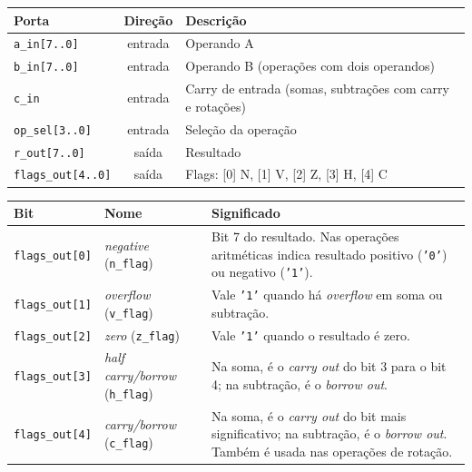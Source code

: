 \begin{quadro}[htb]
  \caption{Portas da ALU.}
  \label{quad:portas}
  \centering
  \begin{tabular}{lcl}
    \hline
    Porta & Direção & Descrição \\ \hline
    \texttt{a\_in[7..0]} & entrada & Operando A \\
    \texttt{b\_in[7..0]} & entrada & Operando B (operações com dois operandos) \\
    \texttt{c\_in} & entrada & Carry de entrada (somas, subtrações com carry e rotações) \\
    \texttt{op\_sel[3..0]} & entrada & Seleção da operação \\
    \texttt{r\_out[7..0]} & saída & Resultado \\
    \texttt{flags\_out[4..0]} & saída & Flags: [0] N, [1] V, [2] Z, [3] H, [4] C \\ \hline
  \end{tabular}
\end{quadro}

\begin{quadro}[htb]
\caption{\emph{Flags} de saída da ALU.}\label{qua:flags}
\small
\begin{tabular}{|l|l|p{8.2cm}|}
\hline
\textbf{Bit} & \textbf{Nome} & \textbf{Significado} \\ \hline
\texttt{flags\_out[0]} & \emph{negative} (\texttt{n\_flag}) & Bit 7 do resultado. Nas operações aritméticas indica resultado positivo (\texttt{'0'}) ou negativo (\texttt{'1'}). \\ \hline
\texttt{flags\_out[1]} & \emph{overflow} (\texttt{v\_flag}) & Vale \texttt{'1'} quando há \emph{overflow} em soma ou subtração. \\ \hline
\texttt{flags\_out[2]} & \emph{zero} (\texttt{z\_flag}) & Vale \texttt{'1'} quando o resultado é zero. \\ \hline
\texttt{flags\_out[3]} & \emph{half carry/borrow} (\texttt{h\_flag}) & Na soma, é o \emph{carry out} do bit 3 para o bit 4; na subtração, é o \emph{borrow out}. \\ \hline
\texttt{flags\_out[4]} & \emph{carry/borrow} (\texttt{c\_flag}) & Na soma, é o \emph{carry out} do bit mais significativo; na subtração, é o \emph{borrow out}. Também é usada nas operações de rotação. \\ \hline
\end{tabular}
\end{quadro}

